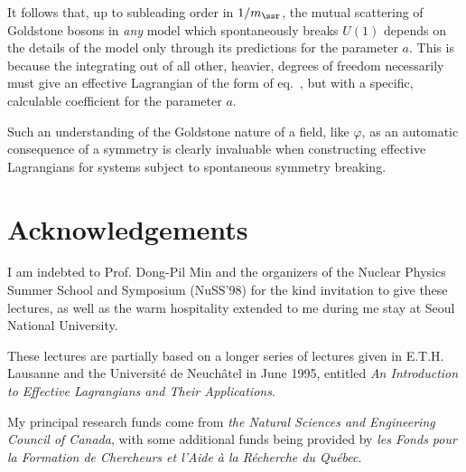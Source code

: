 It follows that, up to subleading order in $1/m_\ssr$, the 
mutual scattering of Goldstone bosons in {\sl any}
model which spontaneously breaks $U(1)$ depends on the
details of the model only through its predictions for the
parameter $a$. This is because the integrating out of all
other, heavier, degrees of freedom necessarily must give
an effective Lagrangian of the form of eq.~, but
with a specific, calculable coefficient for the parameter $a$. 


Such an understanding of the Goldstone nature of a field, like $\varphi$, as
an automatic consequence of a symmetry is clearly invaluable when constructing
effective Lagrangians for systems subject to spontaneous symmetry breaking.


\section*{Acknowledgements}
I am indebted to Prof. Dong-Pil Min and the organizers of
the Nuclear Physics Summer School and Symposium (NuSS'98) 
for the kind invitation to give these lectures, as well as the warm
hospitality extended to me during me stay at Seoul National University.

These lectures are partially based on a longer series of lectures
given in E.T.H. Lausanne and the Universit\'e de
Neuch\^atel in June 1995, entitled 
{\it An Introduction to Effective Lagrangians and Their Applications}. 

My principal research funds come from {\sl the Natural Sciences and 
Engineering Council of Canada}, with some additional funds 
being provided by {\sl les Fonds pour la Formation de Chercheurs 
et l'Aide \`a la R\'echerche du Qu\'ebec}. 




